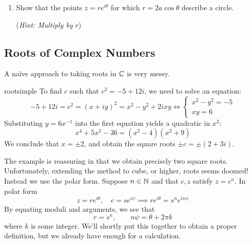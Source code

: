 \begin{exercises*}
\begin{enumerate}
\begin{enumerate}
	    \item Show that the points $z=re^{i\theta}$ for which $r=2a\cos\theta$ describe a circle.\par
	    (\emph{Hint: Multiply by $r$})	
		\end{enumerate}
	\end{enumerate}
\end{exercises*}

\clearpage



\subsection{Roots of Complex Numbers}%

A naïve approach to taking roots in $\mathbb{C}$ is very messy.

\begin{example}{}{rootsimple}
	To find $c$ such that $c^2=-5+12i$, we need to solve an equation:
	\[
		-5+12i=c^2=(x+iy)^2=x^2-y^2+2ixy\iff 
		\begin{cases}
			x^2-y^2=-5\\
			xy=6
		\end{cases}
	\]
	Substituting $y=6x^{-1}$ into the first equation yields a quadratic in $x^2$:
	\[
		x^4+5x^2-36=(x^2-4)(x^2+9)
	\]
	We conclude that $x=\pm 2$, and obtain the square roots $\pm c=\pm(2+3i)$.
\end{example}

The example is reassuring in that we obtain precisely two square roots. Unfortunately, extending the method to cube, or higher, roots seems doomed! Instead we use the polar form. Suppose $n\in\mathbb{N}$ and that $c,z$ satisfy $z=c^n$. In polar form
\[
	z=re^{i\theta},\quad c=se^{i\psi}\implies re^{i\theta}=s^ne^{in\psi}
\]
By equating moduli and arguments, we see that
\[
	r=s^n,\qquad n\psi=\theta+2\pi k\tag{$\ast$}
\]
where $k$ is some integer. We'll shortly put this together to obtain a proper definition, but we already have enough for a calculation.

